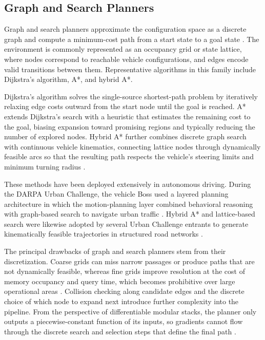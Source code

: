 \subsection{Graph and Search Planners}
\label{subsection:GraphandSearch}

Graph and search planners approximate the configuration space as a discrete graph and compute a minimum-cost path from a start state to a goal state \cite{gonzalez_ReviewMotionPlanning_2016, loganathan_systematic_2023}.
The environment is commonly represented as an occupancy grid or state lattice, where nodes correspond to reachable vehicle configurations, and edges encode valid transitions between them.
Representative algorithms in this family include Dijkstra's algorithm, A*, and hybrid A*.

Dijkstra's algorithm solves the single-source shortest-path problem by iteratively relaxing edge costs outward from the start node until the goal is reached.
A* extends Dijkstra's search with a heuristic that estimates the remaining cost to the goal, biasing expansion toward promising regions and typically reducing the number of explored nodes.
Hybrid A* further combines discrete graph search with continuous vehicle kinematics, connecting lattice nodes through dynamically feasible arcs so that the resulting path respects the vehicle's steering limits and minimum turning radius \cite{gonzalez_ReviewMotionPlanning_2016}.

These methods have been deployed extensively in autonomous driving.
During the DARPA Urban Challenge, the vehicle Boss used a layered planning architecture in which the motion-planning layer combined behavioral reasoning with graph-based search to navigate urban traffic \cite{urmson_autonomous_2008}.
Hybrid A* and lattice-based search were likewise adopted by several Urban Challenge entrants to generate kinematically feasible trajectories in structured road networks \cite{gonzalez_ReviewMotionPlanning_2016}.

The principal drawbacks of graph and search planners stem from their discretization.
Coarse grids can miss narrow passages or produce paths that are not dynamically feasible, whereas fine grids improve resolution at the cost of memory occupancy and query time, which becomes prohibitive over large operational areas \cite{gonzalez_ReviewMotionPlanning_2016, loganathan_systematic_2023}.
Collision checking along candidate edges and the discrete choice of which node to expand next introduce further complexity into the pipeline.
From the perspective of differentiable modular stacks, the planner only outputs a piecewise-constant function of its inputs, so gradients cannot flow through the discrete search and selection steps that define the final path \cite{koch_DifferentiableInterpretablePath_2025, karkus_DiffStackDifferentiableModular_2022}.

